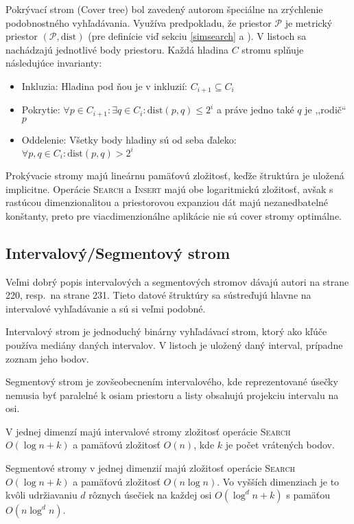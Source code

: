 \documentclass[12pt,a4paper,oneside]{article}
\newcommand{\dist}{\text{dist}} %
\begin{document}
{Pokrývací strom (Cover tree) bol zavedený autorom \citet{Clarkson06} špeciálne na zrýchlenie podobnostného vyhľadávania. Využíva predpokladu, že priestor $\mathcal{P}$ je metrický priestor $(\mathcal{P}, \dist)$ (pre definície viď sekciu \ref{simsearch} a \citet{choudhary92}). V listoch sa nachádzajú jednotlivé body priestoru. Každá hladina $C$ stromu splňuje následujúce invarianty:
\begin{itemize}
\item Inkluzia: Hladina pod ňou je v inkluzií: $C_{i+1} \subseteq C_i$
\item Pokrytie: $\forall p \in C_{i+1} : \exists q \in C_i : \dist(p, q) \leq 2^i$ a práve jedno také $q$ je ,,rodič`` $p$
\item Oddelenie: Všetky body hladiny sú od seba ďaleko: $\forall p,q \in C_i : \dist(p,q) > 2^i$
\end{itemize}

Prokývacie stromy majú lineárnu pamäťovú zložitosť, keďže štruktúra je uložená implicitne. Operácie \textsc{Search} a \textsc{Insert} majú obe logaritmickú zložitosť, avšak s rastúcou dimenzionalitou a priestorovou expanziou dát majú nezanedbatelné konštanty, preto pre viacdimenzionálne aplikácie nie sú cover stromy optimálne.

\subsection{Intervalový/Segmentový strom}\label{intsegtree}

Veľmi dobrý popis intervalových a segmentových stromov dávajú autori \citet{berg08} na strane 220, resp.~na strane 231. Tieto datové štruktúry sa sústreďujú hlavne na intervalové vyhľadávanie a sú si veľmi podobné. 

Intervalový strom je jednoduchý binárny vyhľadávací strom, ktorý ako kľúče používa mediány daných intervalov. V listoch je uložený daný interval, prípadne zoznam jeho bodov.

Segmentový strom je zovšeobecnením intervalového, kde reprezentované úsečky nemusia byť paralelné k osiam priestoru a listy obsahujú projekciu intervalu na osi.

V jednej dimenzí majú intervalové stromy zložitosť operácie \textsc{Search} $O(\log n + k)$ a pamäťovú zložitosť $O(n)$, kde $k$ je počet vrátených bodov.

Segmentové stromy v jednej dimenzií majú zložitosť operácie \textsc{Search} $O(\log n + k)$ a pamäťovú zložitosť $O(n \log n)$. Vo vyšších dimenziach je to kvôli udržiavaniu $d$ rôznych úsečiek na každej osi $O(\log^d n + k)$ s pamäťou $O(n\log^d n)$.

}
\end{document}
